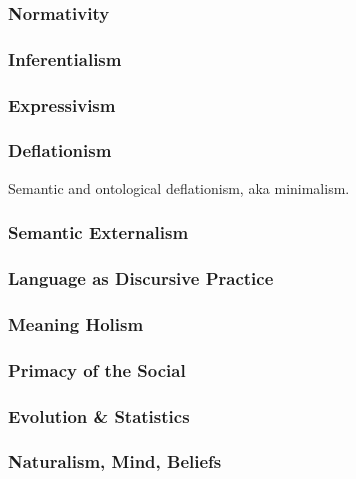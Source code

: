 \documentclass[11pt,twoside]{article}
\begin{document}
\subsubsection{Normativity}
\subsubsection{Inferentialism}
\subsubsection{Expressivism}

\subsubsection{Deflationism}

Semantic and ontological deflationism, aka minimalism.

\subsubsection{Semantic Externalism}

\subsubsection{Language as Discursive Practice}

\subsubsection{Meaning Holism}
\subsubsection{Primacy of the Social}
\subsubsection{Evolution \& Statistics}

\subsubsection{Naturalism, Mind, Beliefs}
\end{document}
